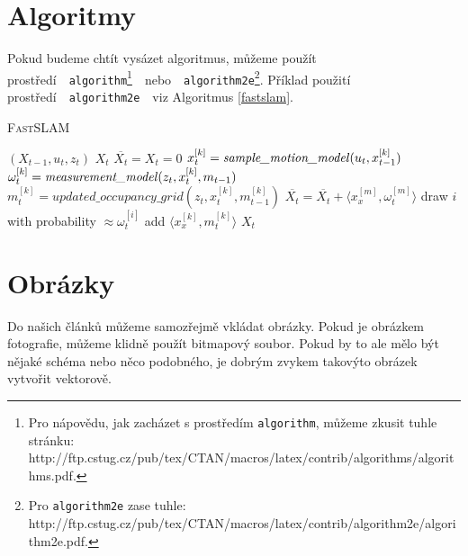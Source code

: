 \documentclass[a4paper, 11pt]{article}
\begin{document}
\pagebreak

\section{Algoritmy}\label{algoritmy}

Pokud budeme chtít vysázet algoritmus, můžeme použít prostředí\ \ \texttt{algorithm}\footnote{Pro nápovědu, jak zacházet s prostředím \texttt{algorithm}, můžeme zkusit tuhle stránku:\\ http://ftp.cstug.cz/pub/tex/CTAN/macros/latex/contrib/algorithms/algorithms.pdf.}\ \ nebo\ \ \texttt{algorithm2e}\footnote{Pro \texttt{algorithm2e} zase tuhle: http://ftp.cstug.cz/pub/tex/CTAN/macros/latex/contrib/algorithm2e/algorithm2e.pdf.}. Příklad použití prostředí\ \ \texttt{algorithm2e}\ \ viz Algoritmus \ref{fastslam}.

\medskip

\begin{algorithm}
\caption{\textsc{FastSLAM}}
\label{fastslam}
\begin{algorithmic}[1]
	\REQUIRE $(X_{t-1}, u_t, z_t)$
	\ENSURE $X_t$
	\STATE $\overline{X_t} = X_t = 0$
		\STATE $x_t^{[k]} = \mbox{\textit{sample\_motion\_model}}(u_t, x_{t-1}^{[k]})$
		\STATE $\omega_t^{[k]} = \mbox{\textit{measurement\_model}}(z_t, x_t^{[k]}, m_{t-1})$
		\STATE $m_t^{[k]} = updated\_occupancy\_grid(z_t, x_t^{[k]}, m_{t-1}^{[k]})$
		\STATE $\overline{X_t} = \overline{X_t} + \langle x_x^{[m]}, \omega_t^{[m]} \rangle$
	\ENDFOR
		\STATE draw $i$ with probability $\approx \omega_t^{[i]}$
		\STATE add $\langle x_x^{[k]}, m_t^{[k]} \rangle$
	\ENDFOR
	\RETURN $X_t$
\end{algorithmic}
\end{algorithm}

\section{Obrázky}

Do našich článků můžeme samozřejmě vkládat obrázky. Pokud je obrázkem fotografie, můžeme klidně použít bitmapový soubor. Pokud by to ale mělo být nějaké schéma nebo něco podobného, je dobrým zvykem takovýto obrázek vytvořit vektorově.
\end{document}
